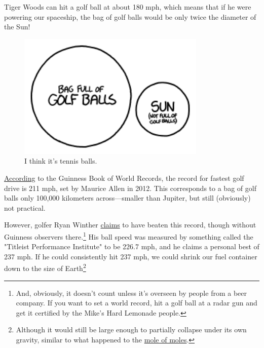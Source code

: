 {{Tiger Woods can hit a golf ball at about 180 mph, which means that if he were powering our spaceship, the bag of golf balls would be only twice the diameter of the Sun!}

\begin{figure}[!htbp]
\centering
\includegraphics[scale=0.5, max width=0.8\textwidth]{imgs/a/85/golf_180.png}
\caption{I think it's tennis balls.}
\end{figure}

{ \href{http://www.guinnessworldrecords.com/records-10000/fastest-golf-drive/}{According} to the Guinness Book of World Records, the record for fastest golf drive is 211 mph, set by Maurice Allen in 2012. This corresponds to a bag of golf balls only 100,000 kilometers across—smaller than Jupiter, but still (obviously) not practical.}

{However, golfer Ryan Winther \href{http://www.ryanwinther.com/about\_records.htm}{claims} to have beaten this record, though without Guinness observers there.{\footnote{And, obviously, it doesn't count unless it's overseen by people from a beer company. If you want to set a world record, hit a golf ball at a radar gun and get it certified by the Mike's Hard Lemonade people.} } His ball speed was measured by something called the "Titleist Performance Institute" to be 226.7 mph, and he claims a personal best of 237 mph. If he could consistently hit 237 mph, we could shrink our fuel container down to the size of Earth{\footnote{Although it would still be large enough to partially collapse under its own gravity, similar to what happened to the \href{http://what-if.xkcd.com/4/} {mole of moles}.} } }

}
